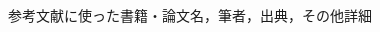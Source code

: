 \clearpage
{} %
\renewcommand{\bibname}{参考文献} %
\begin{thebibliography}{99999}

\bibitem{}
参考文献に使った書籍・論文名，筆者，出典，その他詳細

\end{thebibliography}
